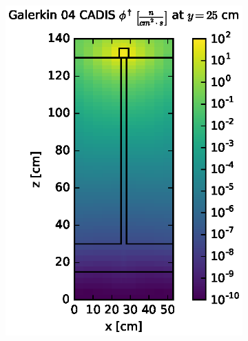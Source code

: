 \begin{figure}[!htb]
\begin{subfigure}{0.4\textwidth}
\includegraphics[max height=0.445\textheight]
{img/steel-plots/cad-adj/flux-gkn04-slice.eps}
\end{subfigure}
\\
\begin{subfigure}{0.4\textwidth}

\end{subfigure}
\end{figure}
